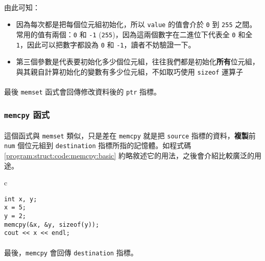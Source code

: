 \documentclass[12pt,a4paper,oneside]{report}
\begin{document}
\begin{CJK}{UTF8}{bkai}
\paragraph{}由此可知：
\begin{itemize}
\item 因為每次都是把每個位元組初始化，所以 \lstinline!value! 的值會介於 \lstinline!0! 到 \lstinline!255! 之間。常用的值有兩個：\lstinline!0! 和 \lstinline!-1! (\lstinline!255!)，因為這兩個數字在二進位下代表全 \lstinline!0! 和全 \lstinline!1!，因此可以把數字都設為 \lstinline!0! 和 \lstinline!-1!，讀者不妨驗證一下。
\item 第三個參數是代表要初始化多少個位元組，往往我們都是初始化\textbf{所有}位元組，與其親自計算初始化的變數有多少位元組，不如取巧使用 \lstinline!sizeof! 運算子
\end{itemize}

\paragraph{}最後 \lstinline!memset! 函式會回傳修改資料後的 \lstinline!ptr! 指標。

\subsubsection{\lstinline!memcpy! 函式}

\paragraph{}這個函式與 \lstinline!memset! 類似，只是差在 \lstinline!memcpy! 就是把 \lstinline!source! 指標的資料，{\color{blue}\textbf{複製}}前 \lstinline!num! 個位元組到 \lstinline!destination! 指標所指的記憶體。如程式碼 \ref{program:struct:code:memcpy:basic} 約略敘述它的用法，之後會介紹比較廣泛的用途。

\begin{code}[h!]
\centering
\begin{tabular}{c}
\begin{lstlisting}
int x, y;
x = 5;
y = 2;
memcpy(&x, &y, sizeof(y));
cout << x << endl;
\end{lstlisting}
\end{tabular}
\caption{\lstinline!memcpy! 用法}
\label{program:struct:code:memcpy:basic}
\end{code}

\paragraph{}最後，\lstinline!memcpy! 會回傳 \lstinline!destination! 指標。


\end{CJK}
\end{document}
